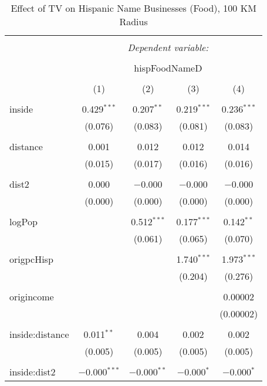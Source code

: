 
\begin{table}[!htbp] \centering 
  \caption{Effect of TV on Hispanic Name Businesses (Food), 100 KM Radius} 
  \label{} 
\begin{tabular}{@{\extracolsep{-5pt}}lcccc} 
\\[-1.8ex]\hline 
\hline \\[-1.8ex] 
 & \multicolumn{4}{c}{\textit{Dependent variable:}} \\ 
\cline{2-5} 
\\[-1.8ex] & \multicolumn{4}{c}{hispFoodNameD} \\ 
\\[-1.8ex] & (1) & (2) & (3) & (4)\\ 
\hline \\[-1.8ex] 
 inside & 0.429$^{***}$ & 0.207$^{**}$ & 0.219$^{***}$ & 0.236$^{***}$ \\ 
  & (0.076) & (0.083) & (0.081) & (0.083) \\ 
  & & & & \\ 
 distance & 0.001 & 0.012 & 0.012 & 0.014 \\ 
  & (0.015) & (0.017) & (0.016) & (0.016) \\ 
  & & & & \\ 
 dist2 & 0.000 & $-$0.000 & $-$0.000 & $-$0.000 \\ 
  & (0.000) & (0.000) & (0.000) & (0.000) \\ 
  & & & & \\ 
 logPop &  & 0.512$^{***}$ & 0.177$^{***}$ & 0.142$^{**}$ \\ 
  &  & (0.061) & (0.065) & (0.070) \\ 
  & & & & \\ 
 origpcHisp &  &  & 1.740$^{***}$ & 1.973$^{***}$ \\ 
  &  &  & (0.204) & (0.276) \\ 
  & & & & \\ 
 origincome &  &  &  & 0.00002 \\ 
  &  &  &  & (0.00002) \\ 
  & & & & \\ 
 inside:distance & 0.011$^{**}$ & 0.004 & 0.002 & 0.002 \\ 
  & (0.005) & (0.005) & (0.005) & (0.005) \\ 
  & & & & \\ 
 inside:dist2 & $-$0.000$^{***}$ & $-$0.000$^{**}$ & $-$0.000$^{*}$ & $-$0.000$^{*}$ \\ 

\end{tabular}
\end{table}
